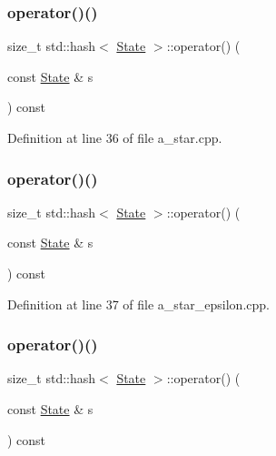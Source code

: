 \subsubsection{\texorpdfstring{operator()()}{operator()()}\hspace{0.1cm}{\footnotesize\ttfamily [1/5]}}
{\footnotesize\ttfamily size\+\_\+t std\+::hash$<$ \hyperlink{struct_state}{State} $>$\+::operator() (\begin{DoxyParamCaption}\item[{const \hyperlink{struct_state}{State} \&}]{s }\end{DoxyParamCaption}) const\hspace{0.3cm}{\ttfamily [inline]}}



Definition at line 36 of file a\+\_\+star.\+cpp.

\mbox{\label{structstd_1_1hash_3_01_state_01_4_af7fa7225302eecf4b97ebb57bcaf3b70}} 
\subsubsection{\texorpdfstring{operator()()}{operator()()}\hspace{0.1cm}{\footnotesize\ttfamily [2/5]}}
{\footnotesize\ttfamily size\+\_\+t std\+::hash$<$ \hyperlink{struct_state}{State} $>$\+::operator() (\begin{DoxyParamCaption}\item[{const \hyperlink{struct_state}{State} \&}]{s }\end{DoxyParamCaption}) const\hspace{0.3cm}{\ttfamily [inline]}}



Definition at line 37 of file a\+\_\+star\+\_\+epsilon.\+cpp.

\mbox{\label{structstd_1_1hash_3_01_state_01_4_af7fa7225302eecf4b97ebb57bcaf3b70}} 
\subsubsection{\texorpdfstring{operator()()}{operator()()}\hspace{0.1cm}{\footnotesize\ttfamily [3/5]}}
{\footnotesize\ttfamily size\+\_\+t std\+::hash$<$ \hyperlink{struct_state}{State} $>$\+::operator() (\begin{DoxyParamCaption}\item[{const \hyperlink{struct_state}{State} \&}]{s }\end{DoxyParamCaption}) const\hspace{0.3cm}{\ttfamily [inline]}}



